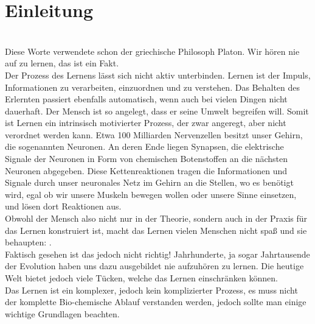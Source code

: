 \section{Einleitung}
\\
Diese Worte verwendete schon der griechische Philosoph Platon. Wir hören nie auf zu lernen, das ist ein Fakt. \\
Der Prozess des Lernens lässt sich nicht aktiv unterbinden. Lernen ist der Impuls, Informationen zu verarbeiten, einzuordnen und zu verstehen. Das Behalten des Erlernten passiert ebenfalls automatisch, wenn auch bei vielen Dingen nicht dauerhaft. Der Mensch ist so angelegt, dass er seine Umwelt begreifen will. Somit ist Lernen ein intrinsisch motivierter Prozess, der zwar angeregt, aber nicht verordnet werden kann.
Etwa 100 Milliarden Nervenzellen besitzt unser Gehirn, die sogenannten Neuronen. An deren Ende liegen Synapsen, die elektrische Signale der Neuronen in Form von chemischen Botenstoffen an die nächsten Neuronen abgegeben. Diese Kettenreaktionen tragen die Informationen und Signale durch unser neuronales Netz im Gehirn an die Stellen, wo es benötigt wird, egal ob wir unsere Muskeln bewegen wollen oder unsere Sinne einsetzen, und lösen dort Reaktionen aus. \\
Obwohl der Mensch also nicht nur in der Theorie, sondern auch in der Praxis für das Lernen konstruiert ist, macht das Lernen vielen Menschen nicht spaß und sie behaupten: . \\
Faktisch gesehen ist das jedoch nicht richtig! Jahrhunderte, ja sogar Jahrtausende der Evolution haben uns dazu ausgebildet nie aufzuhören zu lernen. Die heutige Welt bietet jedoch viele Tücken, welche das Lernen einschränken können. \\
Das Lernen ist ein komplexer, jedoch kein komplizierter Prozess, es muss nicht der komplette Bio-chemische Ablauf verstanden werden, jedoch sollte man einige wichtige Grundlagen beachten.